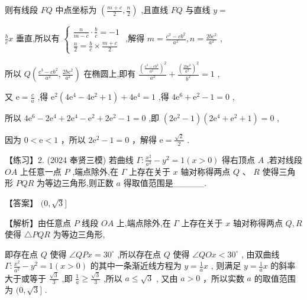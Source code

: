 \documentclass[10pt]{article}
\begin{document}
则有线段 \({FQ}\) 中点坐标为 \(\left( {\frac{m + c}{2},\frac{n}{2}}\right)\) ,且直线 \({FQ}\) 与直线 \(y =\)

\(\frac{b}{c}x\) 垂直,所以有 \(\left\{  \begin{array}{l} \frac{n}{m - c} \cdot  \frac{b}{c} =  - 1 \\  \frac{n}{2} = \frac{b}{c} \times  \frac{m + c}{2} \end{array}\right.\) ,解得 \(m = \frac{{c}^{3} - c{b}^{2}}{{a}^{2}},n = \frac{{2b}{c}^{2}}{{a}^{2}}\) ,

所以 \(Q\left( {\frac{{c}^{3} - c{b}^{2}}{{a}^{2}},\frac{{2b}{c}^{2}}{{a}^{2}}}\right)\) 在椭圆上,即有 \(\frac{{\left( \frac{{c}^{3} - c{b}^{2}}{{a}^{2}}\right) }^{2}}{{a}^{2}} + \frac{{\left( \frac{{2b}{c}^{2}}{{a}^{2}}\right) }^{2}}{{b}^{2}} = 1\) ,

又 \(\mathrm{e} = \frac{c}{a}\) ,得 \({\mathrm{e}}^{2}\left( {4{\mathrm{e}}^{4} - 4{\mathrm{e}}^{2} + 1}\right)  + 4{\mathrm{e}}^{4} = 1\) ,得 \(4{\mathrm{e}}^{6} + {\mathrm{e}}^{2} - 1 = 0\) ,

所以 \(4{\mathrm{e}}^{6} - 2{\mathrm{e}}^{4} + 2{\mathrm{e}}^{4} - {\mathrm{e}}^{2} + 2{\mathrm{e}}^{2} - 1 = 0\) ,即 \(\left( {2{\mathrm{e}}^{2} - 1}\right) \left( {2{\mathrm{e}}^{4} + {\mathrm{e}}^{2} + 1}\right)  = 0\) ,

因为 \(0 < \mathrm{e} < 1\) ，所以 \(2{\mathrm{e}}^{2} - 1 = 0\) ，解得 \(\mathrm{e} = \frac{\sqrt{2}}{2}\) .

【练习】2. (2024 奉贤三模) 若曲线 \(\Gamma  : \frac{{x}^{2}}{{a}^{2}} - {y}^{2} = 1\left( {x > 0}\right)\) 得右顶点 \(A\) ,若对线段 \({OA}\) 上任意一点 \(P\) ,端点除外,在 \(\Gamma\) 上存在关于 \(x\) 轴对称得两点 \(Q\text{ 、 }R\) 使得三角形 \({PQR}\) 为等边三角形,则正数 \(a\) 得取值范围是\_\_\_\_\_.

【答案】 \((0,\sqrt{3}\rbrack\)

【解析】由任意点 \(P\) 线段 \({OA}\) 上,端点除外,在 \(\Gamma\) 上存在关于 \(x\) 轴对称得两点 \(Q,R\) 使得 \(\bigtriangleup {PQR}\) 为等边三角形,

即存在点 \(Q\) 使得 \(\angle {QPx} = {30}^{ \circ  }\) ,所以存在点 \(Q\) 使得 \(\angle {QOx} < {30}^{ \circ  }\) , 由双曲线 \(\Gamma  : \frac{{x}^{2}}{{a}^{2}} - {y}^{2} = 1\left( {x > 0}\right)\) 的其中一条渐近线方程为 \(y = \frac{1}{a}x\) , 则满足 \(y = \frac{1}{a}x\) 的斜率大于或等于 \(\frac{\sqrt{3}}{3}\) ,即 \(\frac{1}{a} \geq  \frac{\sqrt{3}}{3}\) ,所以 \(a \leq  \sqrt{3}\) , 又由 \(a > 0\) ，所以实数 \(a\) 的取值范围为 \((0,\sqrt{3}\rbrack\) .
\end{document}
